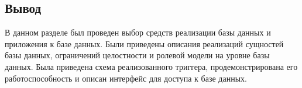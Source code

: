 
\subsection*{Вывод}

В данном разделе был проведен выбор средств реализации базы данных и приложения к базе данных.
Были приведены описания реализаций сущностей базы данных, ограничений целостности и ролевой модели на уровне базы данных.
Была приведена схема реализованного триггера, продемонстрирована его работоспособность и описан интерфейс для доступа к базе данных.
